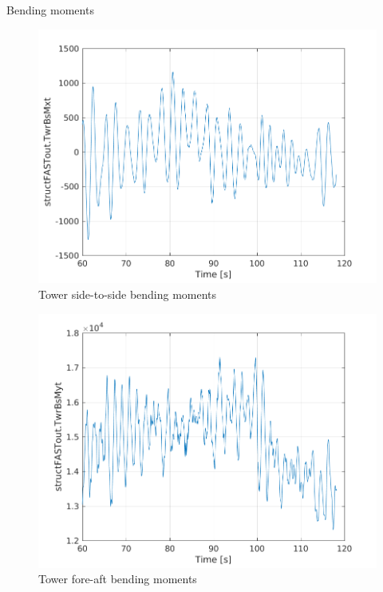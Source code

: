 \documentclass[12pt,t]{beamer}
\begin{document}
\begin{frame}
\huge
Bending moments

\begin{figure}[H]
  \centering
\begin{minipage}{0.38\textwidth}
  \centering
  \includegraphics[width=1\linewidth]{../CIP_6/FAST/Plots_ws5/TwrBsMxt.png} \\
  \tiny
  Tower side-to-side bending moments
\end{minipage}
\begin{minipage}{0.38\textwidth}
  \centering
  \includegraphics[width=1\linewidth]{../CIP_6/FAST/Plots_ws5/TwrBsMyt.png} \\
   \tiny
    Tower fore-aft bending moments

\end{minipage}
\end{figure}
\end{frame}
\end{document}
